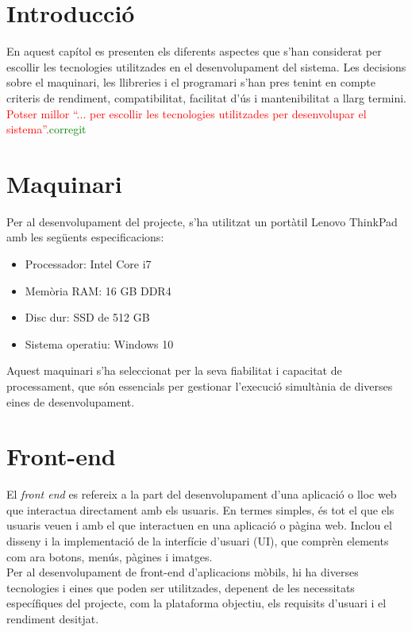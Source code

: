 \documentclass[a4paper,12pt,twoside]{ThesisStyle}
\newcommand{\pau}[1]{\textcolor{red}{#1}}
\newcommand{\sudan}[1]{\textcolor{green}{#1}}
\begin{document}
\section{Introducció}
\label{sec:Introducció}

En aquest capítol es presenten els diferents aspectes que s'han considerat per escollir les tecnologies utilitzades en el desenvolupament del sistema. Les decisions sobre el maquinari, les llibreries i el programari s'han pres tenint en compte criteris de rendiment, compatibilitat, facilitat d'ús i mantenibilitat a llarg termini.
 \pau{Potser millor ``... per escollir les tecnologies utilitzades per desenvolupar el sistema''.}\sudan{corregit}


 \section{Maquinari}
 \label{sec: Maquinari}

Per al desenvolupament del projecte, s'ha utilitzat un portàtil Lenovo ThinkPad amb les següents especificacions:

\begin{itemize}
    \item Processador: Intel Core i7
    \item Memòria RAM: 16 GB DDR4
    \item Disc dur: SSD de 512 GB
    \item Sistema operatiu: Windows 10
\end{itemize}

Aquest maquinari s'ha seleccionat per la seva fiabilitat i capacitat de processament, que són essencials per gestionar l'execució simultània de diverses eines de desenvolupament.



\section{Front-end}
\label{sec: Front-end}

El \textit{front end} es refereix a la part del desenvolupament d'una aplicació o lloc web que interactua directament amb els usuaris. En termes simples, és tot el que els usuaris veuen i amb el que interactuen en una aplicació o pàgina web. Inclou el disseny i la implementació de la interfície d'usuari (UI), que comprèn elements com ara botons, menús, pàgines i imatges.\\

Per al desenvolupament de front-end d'aplicacions mòbils, hi ha diverses tecnologies i eines que poden ser utilitzades, depenent de les necessitats específiques del projecte, com la plataforma objectiu, els requisits d'usuari i el rendiment desitjat. 
\end{document}

